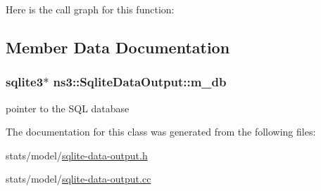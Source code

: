 Here is the call graph for this function\+:




\subsection{Member Data Documentation}
\subsubsection[{\texorpdfstring{m\+\_\+db}{m_db}}]{\setlength{\rightskip}{0pt plus 5cm}sqlite3$\ast$ ns3\+::\+Sqlite\+Data\+Output\+::m\+\_\+db\hspace{0.3cm}{\ttfamily [private]}}\hypertarget{classns3_1_1SqliteDataOutput_a6d9dcae5a1595e93e79a8ec365e3bbc9}{}\label{classns3_1_1SqliteDataOutput_a6d9dcae5a1595e93e79a8ec365e3bbc9}


pointer to the S\+QL database 



The documentation for this class was generated from the following files\+:\begin{DoxyCompactItemize}
\item 
stats/model/\hyperlink{sqlite-data-output_8h}{sqlite-\/data-\/output.\+h}\item 
stats/model/\hyperlink{sqlite-data-output_8cc}{sqlite-\/data-\/output.\+cc}\end{DoxyCompactItemize}

